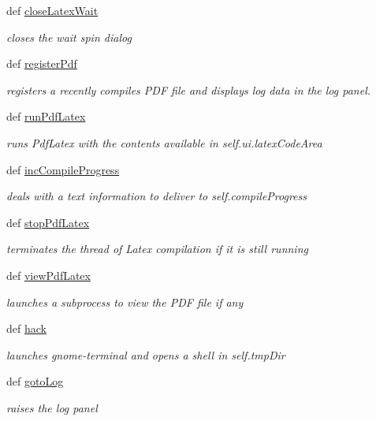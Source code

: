 \begin{DoxyCompactItemize}
def \hyperlink{classuicilibris_1_1w2mMainWindow_afc484d21355b4e2bd6f729f6cdfcf5a0}{close\-Latex\-Wait}
\begin{DoxyCompactList}\small\item\em closes the wait spin dialog \end{DoxyCompactList}\item 
def \hyperlink{classuicilibris_1_1w2mMainWindow_a4f2c62dae7e6c1085fd0f210c53257f4}{register\-Pdf}
\begin{DoxyCompactList}\small\item\em registers a recently compiles \-P\-D\-F file and displays log data in the log panel. \end{DoxyCompactList}\item 
def \hyperlink{classuicilibris_1_1w2mMainWindow_a3cfde91f57684cbb7bf7e54a3fecbeba}{run\-Pdf\-Latex}
\begin{DoxyCompactList}\small\item\em runs \-Pdf\-Latex with the contents available in self.\-ui.\-latex\-Code\-Area \end{DoxyCompactList}\item 
def \hyperlink{classuicilibris_1_1w2mMainWindow_a832d79edba89eabe0de87a3341bb9707}{inc\-Compile\-Progress}
\begin{DoxyCompactList}\small\item\em deals with a text information to deliver to self.\-compile\-Progress \end{DoxyCompactList}\item 
def \hyperlink{classuicilibris_1_1w2mMainWindow_abbbadefbe280076540bf281798cc2869}{stop\-Pdf\-Latex}
\begin{DoxyCompactList}\small\item\em terminates the thread of \-Latex compilation if it is still running \end{DoxyCompactList}\item 
def \hyperlink{classuicilibris_1_1w2mMainWindow_ab7460cd2f26720e6a131093d56bcc68a}{view\-Pdf\-Latex}
\begin{DoxyCompactList}\small\item\em launches a subprocess to view the \-P\-D\-F file if any \end{DoxyCompactList}\item 
def \hyperlink{classuicilibris_1_1w2mMainWindow_a55d3ee40c7ee582b4ce7af1ce91c92d7}{hack}
\begin{DoxyCompactList}\small\item\em launches gnome-\/terminal and opens a shell in self.\-tmp\-Dir \end{DoxyCompactList}\item 
def \hyperlink{classuicilibris_1_1w2mMainWindow_a7895d4ac97825f2105c4508a4b5e82f9}{goto\-Log}
\begin{DoxyCompactList}\small\item\em raises the log panel \end{DoxyCompactList}\end{DoxyCompactItemize}
